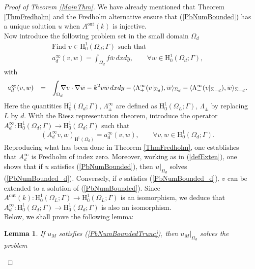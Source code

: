\documentclass[11pt,a4paper]{report}
\newcommand{\dsp}{\displaystyle}
\newcommand{\Om}{\Omega}
\newcommand{\mrm}[1]{\mathrm{#1}}
\newcommand{\mH}{\mrm{H}}
\newtheorem{lemma}[theorem]{Lemma}
\begin{document}
\begin{proof}[Proof of Theorem \ref{MainThm}]
We have already mentioned that Theorem \ref{ThmFredholm} and the Fredholm alternative ensure that (\ref{PbNumBounded}) has a unique solution $u$ when $A^{\mrm{out}}(k)$ is injective.\\
\newline
Now introduce the following problem set in the small domain $\Om_d$
\begin{equation}\label{PbNumBounded_d}
\begin{array}{|l}
\mbox{Find }v\in\mH^1_0(\Om_d;\Gamma) \mbox{ such that }\\[3pt]
a^{\infty}_d(v,w)=\dsp\int_{\Om_d}f\overline{w}\,dxdy,\qquad \forall w\in\mH^1_0(\Om_d;\Gamma),
\end{array}
\end{equation}
with 
\[
\begin{array}{rcl}
a^{\infty}_d(v,w)&=&\dsp\int_{\Om_d}\hspace{-0.2cm}\nabla v\cdot\nabla\overline{w}-k^2 v\overline{w}\,dxdy-\langle\Lambda^{\infty}_+(v|_{\Sigma_{d}}),\overline{w} \rangle_{\Sigma_d}-\langle\Lambda^{\infty}_-(v|_{\Sigma_{-d}}),\overline{w} \rangle_{\Sigma_{-d}}.
\end{array}
\]
Here the quantities $\mH^1_0(\Om_d;\Gamma)$, $\Lambda^{\infty}_\pm$ are defined as $\mH^1_0(\Om_L;\Gamma)$, $\Lambda_\pm$ by replacing $L$ by $d$. With the Riesz representation theorem, introduce the operator $A^\infty_d:\mH^1_0(\Om_d;\Gamma)\to\mH^1_0(\Om_d;\Gamma)$ such that
\[
(A^\infty_dv,w)_{\mH^1(\Om_d)} =a^{\infty}_d(v,w),\qquad\forall v,w\in \mH^1_0(\Om_d;\Gamma).
\]
Reproducing what has been done in Theorem \ref{ThmFredholm}, one establishes that $A^\infty_d$ is Fredholm of index zero. Moreover, working as in (\ref{defExten}), one shows that if $u$ satisfies (\ref{PbNumBounded}), then $u|_{\Om_d}$ solves (\ref{PbNumBounded_d}). Conversely, if $v$ satisfies (\ref{PbNumBounded_d}), $v$ can be extended to a solution of (\ref{PbNumBounded}). Since $A^{\mrm{out}}(k):\mH^1_0(\Om_L;\Gamma)\to\mH^1_0(\Om_L;\Gamma)$ is an isomorphism, we deduce that $A^\infty_d:\mH^1_0(\Om_d;\Gamma)\to\mH^1_0(\Om_d;\Gamma)$ is also an isomorphism.\\
\newline
Below, we shall prove the following lemma:
\begin{lemma}\label{lemmaEstim}
If $u_M$ satisfies (\ref{PbNumBoundedTrunc}), then $u_M|_{\Om_d}$ solves the problem
\begin{equation}\label{PbNumBoundedTruncPert}

\end{equation}
\end{lemma}
\end{proof}
\end{document}
